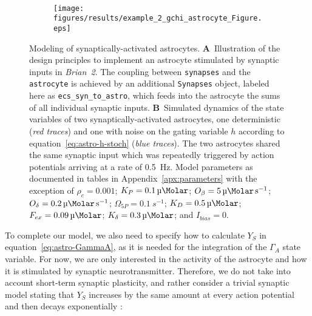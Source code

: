 \documentclass[a4paper, 11pt]{article}
\newcommand{\brian}{\emph{Brian~2}\xspace}
\newcommand*{\appref}[1]{Appendix~\ref{#1}}
\renewcommand*{\eqref}[1]{equation~\ref{#1}}
\begin{document}
\begin{figure}
\begin{subfigure}[!t]{\textwidth}
\end{subfigure}\\[2ex]
\begin{subfigure}[t]{\textwidth}
	\caption{}
	\texttt{[image: figures/results/example\_2\_gchi\_astrocyte\_Figure.eps]}
\end{subfigure}
\caption{Modeling of synaptically-activated astrocytes.
\textbf{A}~Illustration of the design principles to implement an astrocyte stimulated by synaptic inputs in \brian.
The coupling between \lstinline|synapses| and the \lstinline|astrocyte| is achieved by an additional \lstinline|Synapses| object, labeled here as \lstinline|ecs_syn_to_astro|, which feeds into the astrocyte the sums of all individual synaptic inputs.
\textbf{B}~Simulated dynamics of the state variables of two synaptically-activated astrocytes, one deterministic (\textit{red traces}) and one with noise on the gating variable $h$ according to \eqref{eq:astro-h-stoch} (\textit{blue traces}).
The two astrocytes shared the same synaptic input which was repeatedly triggered by action potentials arriving at a rate of \SI{0.5}{\hertz}.
Model parameters as documented in tables in \appref{apx:parameters} with the exception of $\rho_c=0.001$; $K_P=\SI{0.1}{\micro \Molar}$; $O_\beta=\SI{5}{\micro \Molar.s^{-1}}$; $O_\delta=\SI{0.2}{\micro \Molar.s^{-1}}$; $\Omega_{5P}=\SI{0.1}{s^{-1}}$; $K_D=\SI{0.5}{\micro \Molar}$; $F_{ex}=\SI{0.09}{\micro \Molar}$; $K_{\delta}=\SI{0.3}{\micro \Molar}$; and $I_{bias}=0$.}
\label{Fig:astrocyte}
\end{figure}

To complete our model, we also need to specify how to calculate $Y_S$ in \eqref{eq:astro-GammaA}, as it is needed for the integration of the $\Gamma_A$ state variable.
For now, we are only interested in the activity of the astrocyte and how it is stimulated by synaptic neurotransmitter.
Therefore, we do not take into account short-term synaptic plasticity, and rather consider a trivial synaptic model stating that $Y_S$ increases by the same amount at every action potential and then decays exponentially \citep{Dayan2001}:

\end{document}

